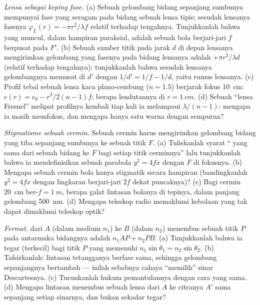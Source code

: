 \begin{exercise}[$\star\star$]\label{exo:b2:scalar-light-model:5}
\emph{Lensa sebagai keping fase.} (a) Sebuah gelombang bidang sepanjang sumbunya mempunyai
fase yang seragam pada bidang sebuah lensa tipis; sesudah lensanya fasenya
$\varphi_L(r) = -\pi r^2/\lambda f$ relatif terhadap tengahnya. Tunjukkanlah bahwa 
yang muncul, dalam hampiran paraksial, adalah sebuah bola berjari-jari $f$
berpusat pada $F'$. (b) Sebuah sumber titik pada jarak $d$ di depan lensanya
mengirimkan gelombang yang fasenya pada bidang lensanya adalah $+\pi r^2/\lambda d$ (relatif terhadap
tengahnya): tunjukkanlah bahwa sesudah lensanya gelombangnya memusat di $d'$ dengan
$1/d' = 1/f - 1/d$, yaitu rumus lensanya. (c) Profil tebal sebuah
lensa kaca plano-cembung ($n = 1.5$) berjarak fokus \qty{10}{cm}: $e(r) =
e_0 - r^2/2(n - 1)f$; berapa lendutannya di $r = \qty{1}{cm}$. (d) Sebuah ``lensa Fresnel'' melipat
profilnya kembali tiap kali ia melampaui $\lambda/(n - 1)$: mengapa ia masih
memfokus, dan mengapa hanya satu warna dengan sempurna?
\end{exercise}

\begin{exercise}[$\star\star$]\label{exo:b2:scalar-light-model:6}
\emph{Stigmatisme sebuah cermin.} Sebuah cermin harus mengirimkan gelombang bidang yang tiba
sepanjang sumbunya ke sebuah titik $F$. (a) Tuliskanlah syarat ``
yang sama dari sebuah  bidang ke $F$ bagi setiap titik cerminnya'' lalu
tunjukkanlah bahwa ia mendefinisikan sebuah parabola $y^2 = 4fx$ dengan $F$ di fokusnya. (b) Mengapa sebuah
cermin bola hanya stigmatik secara hampiran (bandingkanlah $y^2 = 4fx$ dengan
lingkaran berjari-jari $2f$ dekat puncaknya)? (c) Bagi cermin \qty{20}{cm}
ber-$f = \qty{1}{m}$, berapa galat lintasan bolanya di tepinya, dalam
panjang gelombang \qty{500}{nm}. (d) Mengapa teleskop radio memaklumi
kebolaan yang tak dapat dimaklumi teleskop optik?
\end{exercise}

\begin{exercise}[$\star\star$]\label{exo:b2:scalar-light-model:7}
\emph{Fermat.}  dari $A$ (dalam medium $n_1$) ke $B$ (dalam
$n_2$) menembus sebuah titik $P$ pada antarmuka bidangnya adalah $n_1AP + n_2PB$. (a)
Tunjukkanlah bahwa ia tegar (terkecil) bagi titik $P$ yang memenuhi
$n_1\sin\theta_1 = n_2\sin\theta_2$. (b) Tafsirkanlah: lintasan tetangganya berfase
sama, sehingga gelombang sepanjangnya bertambah --- inilah sebabnya cahaya
``memilih'' sinar Descartesnya. (c) Turunkanlah hukum pemantulannya dengan cara
yang sama. (d) Mengapa lintasan menembus sebuah lensa dari $A$ ke citranya $A'$ sama
sepanjang setiap sinarnya, dan bukan sekadar tegar?
\end{exercise}

